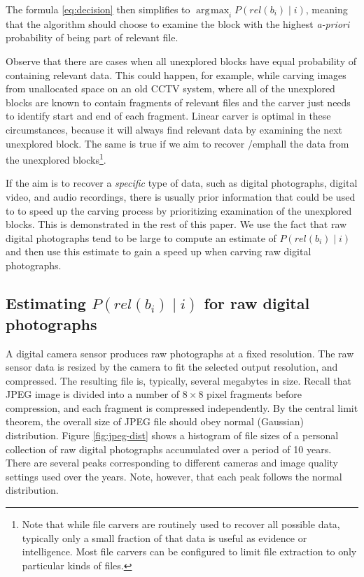 \documentclass[10pt,a4paper]{article}
\DeclareMathOperator*{\argmax}{\arg\!\max}
\begin{document}
The formula \ref{eq:decision} then simplifies to $\argmax_{i} P(rel(b_i) \mid i)$, meaning that the algorithm should choose to examine the block with the highest \emph{a-priori} probability of being part of relevant file. 

Observe that there are cases when all unexplored blocks have equal probability of containing relevant data. This could happen, for example, while carving images from unallocated space on an old CCTV system, where all of the unexplored blocks are known to contain fragments of relevant files and the carver just needs to identify start and end of each fragment.  Linear carver is optimal in these circumstances, because it will always find relevant data by examining the next unexplored block. The same is true if we aim to recover /emph{all} the data from the unexplored blocks\footnote{Note that while file carvers are routinely used to recover all possible data, typically only a small fraction of that data is useful as evidence or intelligence. Most file carvers can be configured to limit file extraction to only particular kinds of files.}. 

If the aim is to recover a \emph{specific} type of data, such as digital photographs, digital video, and audio recordings, there is usually prior information that could be used to to speed up the carving process by prioritizing examination of the unexplored blocks. This is demonstrated in the rest of this paper. We use the fact that raw digital photographs tend to be large to compute an estimate of $P(rel(b_i) \mid i)$ and then use this estimate to gain a speed up when carving raw digital photographs.

\subsection{Estimating $P(rel(b_i) \mid i)$ for raw digital photographs}

A digital camera sensor produces raw photographs at a fixed resolution. The raw sensor data is resized by the camera to fit the selected output resolution, and compressed. The resulting file is, typically, several megabytes in size. Recall that JPEG image is divided into a number of $8 \times 8$ pixel fragments before compression, and each fragment is compressed independently. By the central limit theorem, the overall size of JPEG file should obey normal (Gaussian) distribution. Figure \ref{fig:jpeg-dist} shows a histogram of file sizes of a personal collection of raw digital photographs accumulated over a period of 10 years. There are several peaks corresponding to different cameras and image quality settings used over the years. Note, however, that each peak follows the normal distribution.
\end{document}
